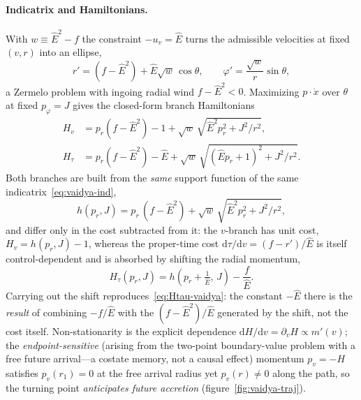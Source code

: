 \documentclass[12pt]{iopart}
\newcommand{\Ehat}{\hat E}
\newcommand{\dd}{\mathrm{d}}
\theoremstyle{plain}
\theoremstyle{definition}
\theoremstyle{plain}
\theoremstyle{remark}
\begin{document}
\paragraph{Indicatrix and Hamiltonians.} With $w\equiv\Ehat^2-f$ the constraint
$-u_v=\Ehat$ turns the admissible velocities at fixed $(v,r)$ into an ellipse,
\begin{equation}
    r'=(f-\Ehat^2)+\Ehat\sqrt w\,\cos\theta,\qquad
    \varphi'=\frac{\sqrt w}{r}\sin\theta,
    \label{eq:vaidya-ind}
\end{equation}
a Zermelo problem with ingoing radial wind $f-\Ehat^2<0$. Maximizing
$p\cdot\dot x$ over $\theta$ at fixed $p_\varphi=J$ gives the closed-form branch
Hamiltonians
\begin{align}
    H_v&=p_r(f-\Ehat^2)-1+\sqrt w\,\sqrt{\Ehat^2 p_r^2+J^2/r^2},
    \label{eq:Hv}\\
    H_\tau&=p_r(f-\Ehat^2)-\Ehat
        +\sqrt w\,\sqrt{(\Ehat p_r+1)^2+J^2/r^2}.
    \label{eq:Htau-vaidya}
\end{align}
Both branches are built from the \emph{same} support function of the same
indicatrix~\eqref{eq:vaidya-ind},
\begin{equation}
   h(p_r,J)=p_r\,(f-\Ehat^2)+\sqrt w\,\sqrt{\Ehat^2p_r^2+J^2/r^2},
   \label{eq:vaidya-support}
\end{equation}
and differ only in the cost subtracted from it: the $v$-branch has unit cost,
$H_v=h(p_r,J)-1$, whereas the proper-time cost $\dd\tau/\dd v=(f-r')/\Ehat$ is itself
control-dependent and is absorbed by shifting the radial momentum,
\begin{equation}
   H_\tau(p_r,J)=h\!\left(p_r+\tfrac1{\Ehat},\,J\right)-\frac{f}{\Ehat} .
   \label{eq:tau-from-v}
\end{equation}
Carrying out the shift reproduces~\eqref{eq:Htau-vaidya}: the constant $-\Ehat$ there is
the \emph{result} of combining $-f/\Ehat$ with the $(f-\Ehat^2)/\Ehat$ generated by the
shift, not the cost itself. Non-stationarity is the explicit dependence
$\dd H/\dd v=\partial_v H\propto m'(v)$; the \emph{endpoint-sensitive} (arising from the
two-point boundary-value problem with a free future arrival---a costate memory, not a
causal effect) momentum $p_v=-H$
satisfies $p_v(r_1)=0$ at the free arrival radius yet $p_v(r)\neq0$ along the
path, so the turning point \emph{anticipates future accretion}
(figure~\ref{fig:vaidya-traj}).
\end{document}
